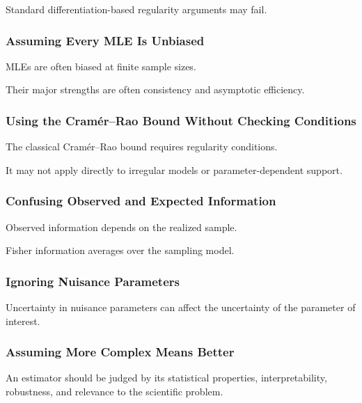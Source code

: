 Standard differentiation-based regularity arguments may fail.

\subsubsection{Assuming Every MLE Is Unbiased}

MLEs are often biased at finite sample sizes.

Their major strengths are often consistency and asymptotic efficiency.

\subsubsection{Using the Cram\'er--Rao Bound Without Checking Conditions}

The classical Cram\'er--Rao bound requires regularity conditions.

It may not apply directly to irregular models or parameter-dependent
support.

\subsubsection{Confusing Observed and Expected Information}

Observed information depends on the realized sample.

Fisher information averages over the sampling model.

\subsubsection{Ignoring Nuisance Parameters}

Uncertainty in nuisance parameters can affect the uncertainty of the
parameter of interest.

\subsubsection{Assuming More Complex Means Better}

An estimator should be judged by its statistical properties,
interpretability, robustness, and relevance to the scientific problem.

